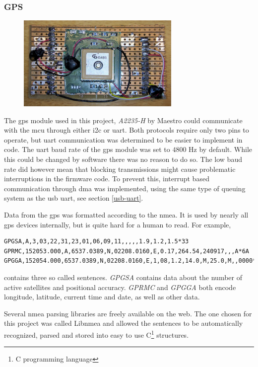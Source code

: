 \subsubsection{GPS}
\begin{figure}[H]
\centering
\includegraphics[width=0.7\textwidth]{Figures/A2235-H.jpg}
\label{gps-figure}
\end{figure}
The \gls{gps} module used in this project, \emph{A2235-H} by Maestro \cite{gps} could communicate with the \gls{mcu} through either \gls{i2c} or \gls{uart}. Both protocols require only two pins to operate, but \gls{uart} communication was determined to be easier to implement in code. The \gls{uart} baud rate of the \gls{gps} module was set to $4800$ Hz by default. While this could be changed by software there was no reason to do so. The low baud rate did however mean that blocking transmissions might cause problematic interruptions in the firmware code. To prevent this, interrupt based communication through \gls{dma} was implemented, using the same type of queuing system as the \gls{usb} \gls{uart}, see section \ref{usb-uart}.

Data from the \gls{gps} was formatted according to the \gls{nmea}. It is used by nearly all \gls{gps} devices internally, but is quite hard for a human to read. For example,
\begin{lstlisting}
GPGSA,A,3,03,22,31,23,01,06,09,11,,,,,1.9,1.2,1.5*33
GPRMC,152053.000,A,6537.0389,N,02208.0160,E,0.17,264.54,240917,,,A*6A
GPGGA,152054.000,6537.0389,N,02208.0160,E,1,08,1.2,14.0,M,25.0,M,,0000*68
\end{lstlisting}
contains three so called sentences. \emph{GPGSA} contains data about the number of active satellites and positional accuracy. \emph{GPRMC} and \emph{GPGGA} both encode longitude, latitude, current time and date, as well as other data.

Several \gls{nmea} parsing libraries are freely available on the web. The one chosen for this project was called Libnmea\cite{libnmea} and allowed the sentences to be automatically recognized, parsed and stored into easy to use C\footnote{C programming language} structures.

